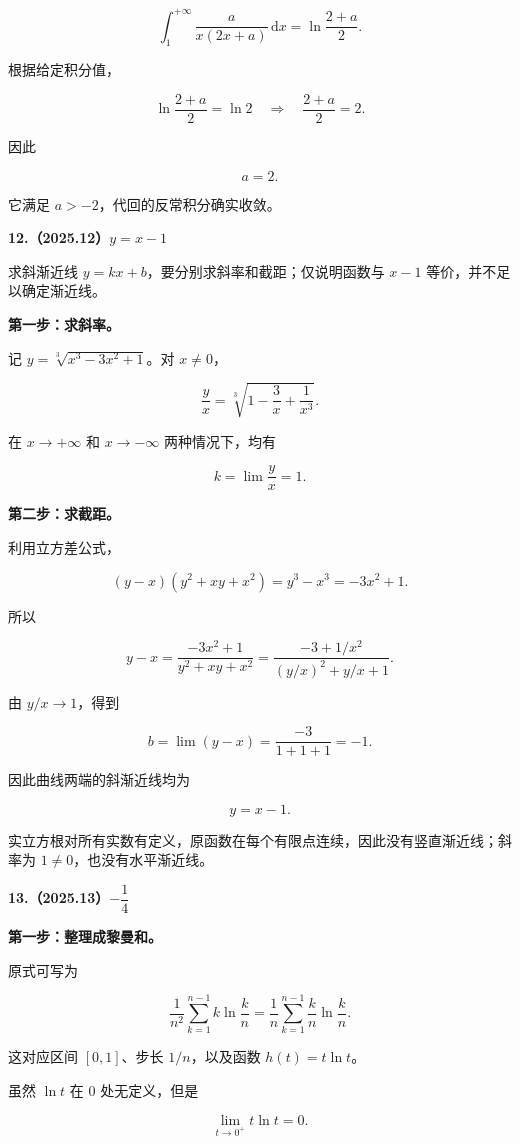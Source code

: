 \documentclass[UTF8,11pt,fontset=windows]{ctexart}
\begin{document}
$$
\int_1^{+\infty}\frac{a}{x(2x+a)}\,\mathrm dx
=\ln\frac{2+a}{2}.
$$

根据给定积分值，

$$
\ln\frac{2+a}{2}=\ln2
\quad\Longrightarrow\quad \frac{2+a}{2}=2.
$$

因此

$$
\boxed{a=2}.
$$

它满足 $a>-2$，代回的反常积分确实收敛。

\clearpage

\textbf{12.（2025.12）$y=x-1$}

求斜渐近线 $y=kx+b$，要分别求斜率和截距；仅说明函数与 $x-1$ 等价，并不足以确定渐近线。

\textbf{第一步：求斜率。}

记 $y=\sqrt[3]{x^3-3x^2+1}$。对 $x\ne0$，

$$
\frac yx=\sqrt[3]{1-\frac3x+\frac1{x^3}}.
$$

在 $x\to+\infty$ 和 $x\to-\infty$ 两种情况下，均有

$$
k=\lim\frac yx=1.
$$

\textbf{第二步：求截距。}

利用立方差公式，

$$
(y-x)(y^2+xy+x^2)=y^3-x^3=-3x^2+1.
$$

所以

$$
y-x=\frac{-3x^2+1}{y^2+xy+x^2}
=\frac{-3+1/x^2}{(y/x)^2+y/x+1}.
$$

由 $y/x\to1$，得到

$$
b=\lim(y-x)=\frac{-3}{1+1+1}=-1.
$$

因此曲线两端的斜渐近线均为

$$
\boxed{y=x-1}.
$$

实立方根对所有实数有定义，原函数在每个有限点连续，因此没有竖直渐近线；斜率为 $1\ne0$，也没有水平渐近线。

\clearpage

\textbf{13.（2025.13）$-\dfrac14$}

\textbf{第一步：整理成黎曼和。}

原式可写为

$$
\frac1{n^2}\sum_{k=1}^{n-1}k\ln\frac kn
=\frac1n\sum_{k=1}^{n-1}\frac kn\ln\frac kn.
$$

这对应区间 $[0,1]$、步长 $1/n$，以及函数 $h(t)=t\ln t$。

虽然 $\ln t$ 在 $0$ 处无定义，但是

$$
\lim_{t\to0^+}t\ln t=0.
$$
\end{document}

